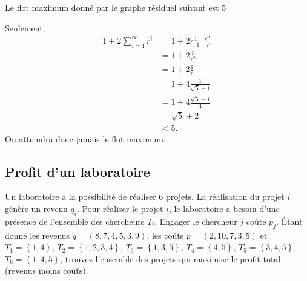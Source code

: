 \begin{solution}
\begin{itemize}
      Le flot maximum donné par le graphe résiduel suivant est 5
      \begin{center}
      \end{center}
      Seulement,
      \begin{align*}
        1 + 2\sum_{i=1}^\infty r^i & = 1 + 2r\frac{1-r^\infty}{1-r}\\
                                   & = 1 + 2\frac{r}{r^2}\\
                                   & = 1 + 2\frac{1}{r}\\
                                   & = 1 + 4\frac{1}{\sqrt{5}-1}\\
                                   & = 1 + 4\frac{\sqrt{5}+1}{4}\\
                                   & = \sqrt{5}+2\\
                                   & < 5.
      \end{align*}
      On atteindra donc jamais le flot maximum.
  \end{itemize}
\end{solution}

\subsection{Profit d'un laboratoire}
Un laboratoire a la possibilité de réaliser 6 projets. La réalisation du projet $i$ génère un revenu $q_i$. Pour réaliser le projet $i$, le laboratoire a besoin d'une présence de l'ensemble des chercheurs $T_i$. Engager le chercheur $j$ coûte $p_j$. Étant donné les revenus $q= (8,7,4,5,3,9)$, les coûts $p=(2,10,7,3,5)$ et $T_1 = \left\lbrace 1, 4 \right\rbrace$, $T_2 = \left\lbrace 1,2,3,4 \right\rbrace$, $T_3 = \left\lbrace 1,3,5 \right\rbrace$, $T_4 = \left\lbrace 4,5 \right\rbrace$, $T_5 = \left\lbrace 3,4,5 \right\rbrace$, $T_6 = \left\lbrace 1, 4,5 \right\rbrace$, trouvez l'ensemble des projets qui maximise le profit total (revenus moins coûts).

